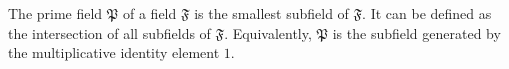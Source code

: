 The prime field $\mathfrak{P}$ of a field $\mathfrak{F}$ is the smallest subfield of $\mathfrak{F}$. It can be defined as the intersection of all subfields of $\mathfrak{F}$. Equivalently, $\mathfrak{P}$ is the subfield generated by the multiplicative identity element $1$.
